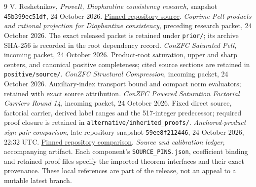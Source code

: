 \begin{thebibliography}{9}
 V. Reshetnikov, \emph{ProveIt, Diophantine consistency
research}, snapshot \texttt{45b399ec51df}, 24 October 2026.
\href{https://github.com/VladimirReshetnikov/ProveIt/tree/45b399ec51dfbecb891dd51d8a9e4b6b7c361ac6/Computability/DiophantineConsistency}{Pinned repository source}.
 \emph{Coprime Pell products and rational projection for
Diophantine consistency}, preceding research packet, 24 October 2026.
The exact released packet is retained under \texttt{prior/}; its archive
SHA-256 is recorded in the root dependency record.
 \emph{ConZFC Saturated Pell}, incoming packet,
24 October 2026. Product-root saturation, upper and sharp centers, and
canonical positive completeness; cited source sections are retained in
\texttt{positive/source/}.
 \emph{ConZFC Structural Compression}, incoming
packet, 24 October 2026. Auxiliary-index transport bound and compact norm
evaluators; retained with exact source attribution.
 \emph{ConZFC Powered Saturation Factorial Carriers
Round 14}, incoming packet, 24 October 2026. Fixed direct source, factorial
carrier, derived label ranges and the 517-integer predecessor;
required proof closure is retained in \texttt{alternative/inherited\_proofs/}.
 \emph{Anchored-product sign-pair comparison},
late repository snapshot \texttt{59ee8f212446}, 24 October 2026,
22:32 UTC. \href{https://github.com/VladimirReshetnikov/ProveIt/tree/59ee8f21244635b42f706a74c4e9631226dd1f7c}{Pinned repository comparison}.
 \emph{Source and calibration ledger}, accompanying
artifact. Each component's \texttt{SOURCE\_PINS.json}, coefficient binding
and retained proof files specify the imported theorem interfaces and
their exact provenance. These local references are part of the release,
not an appeal to a mutable latest branch.
\end{thebibliography}
